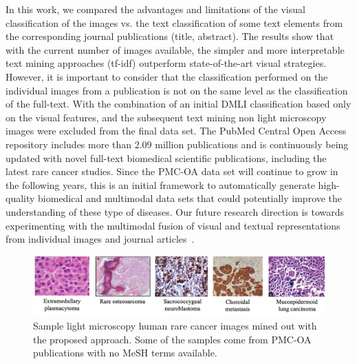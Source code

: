 \documentclass[]{spie}  %
\begin{document}
In this work, we compared the advantages and limitations of the visual classification of the images vs. the text classification of some text elements from the corresponding journal publications (title, abstract). 
The results show that with the current number of images available, the simpler and more interpretable text mining approaches (tf-idf) outperform state-of-the-art visual strategies. 
However, it is important to consider that the classification performed on the individual images from a publication is not on the same level as the classification of the full-text. 
With the combination of an initial DMLI classification based only on the visual features, and the subsequent text mining non light microscopy images were excluded from the final data set.
The PubMed Central Open Access repository includes more than 2.09 million publications and is continuously being updated with novel full-text biomedical scientific publications, including the latest rare cancer studies.
Since the PMC-OA data set will continue to grow in the following years, this is an initial framework to automatically generate high-quality biomedical and multimodal data sets that could potentially improve the understanding of these type of diseases.
Our future research direction is towards experimenting with the multimodal fusion of visual and textual representations from individual images and journal articles~\cite{arevalo2017gated}.
%
\begin{figure}
    \centering
    \includegraphics[width=\textwidth]{figures/samples_predicted_rareCancers.png}
    \caption{Sample light microscopy human rare cancer images mined out with the proposed approach. Some of the samples come from PMC-OA publications with no MeSH terms available.}
    \label{fig:rare_cancers}
\end{figure}
\vspace{5mm}
%
%
\end{document}
